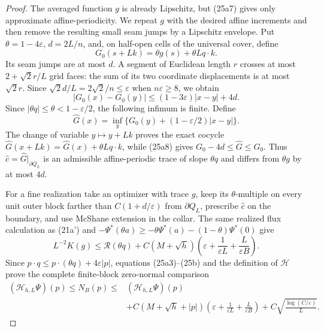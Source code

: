 \documentclass{aomart}
\theoremstyle{definition}
\newcommand{\1}{\mathbf 1}
\begin{document}
\begin{proof}
The averaged function $g$ is already Lipschitz, but (25a7) gives only
approximate affine-periodicity.  We repeat $g$ with the desired affine
increments and then remove the resulting small seam jumps by a Lipschitz
envelope.  Put
$\theta=1-4\varepsilon$, $d=2L/n$, and, on half-open cells of the
universal cover, define
\begin{equation*}
G_ 0(s+Lk)=\theta g(s)+\theta Lq\cdot k.
\end{equation*}
Its seam jumps are at most $d$.  A segment of Euclidean length $r$
crosses at most $2+\sqrt2r/L$ grid faces: the sum of its two coordinate
displacements is at most $\sqrt2r$.  Since
$\sqrt2d/L=2\sqrt2/n\leq\varepsilon$ when $n\varepsilon\geq8$, we obtain
\begin{equation}
|G_ 0(x)-G_ 0(y)|\leq(1-3\varepsilon)|x-y|+4d.
\tag{25a8}
\end{equation}
Since $|\theta q|\leq\theta<1-\varepsilon/2$, the following
infimum is finite.  Define
\begin{equation*}
\widehat G(x)=\inf_ y\{G_ 0(y)+(1-\varepsilon/2)|x-y|\}.
\end{equation*}
The change of variable $y\mapsto y+Lk$ proves the exact cocycle
$\widehat G(x+Lk)=\widehat G(x)+\theta Lq\cdot k$, while (25a8)
gives $G_ 0-4d\leq\widehat G\leq G_ 0$.  Thus
$\widehat c=\widehat G|_ {\partial Q_ L}$ is an admissible
affine-periodic trace of slope $\theta q$ and differs from
$\theta g$ by at most $4d$.

For a fine realization take an optimizer with trace $g$, keep its
$\theta$-multiple on every unit outer block farther than
$C(1+d/\varepsilon)$ from $\partial Q_ L$, prescribe
$\widehat c$ on the boundary, and use McShane extension in the collar.
The same realized flux calculation as (21a') and
$-\Psi^*(\theta a)\geq-\theta\Psi^*(a)
-(1-\theta)\Psi^*(0)$ give
\begin{equation}
L^{-2}K(g)\leq \mathcal R(\theta q)+C(M+\sqrt h)
\left(\varepsilon+\frac1{\varepsilon L}
+\frac L{\varepsilon B}\right).
\tag{25b}
\end{equation}
Since $p\cdot q\leq p\cdot(\theta q)+4\varepsilon|p|$, equations
(25a3)--(25b) and the definition of $\mathcal H$ prove the complete
finite-block zero-normal comparison
\begin{equation}
\boxed{\begin{aligned}
(\mathcal H_ {h,L}\Psi)(p)\leq N_ B(p)
\leq{}&(\mathcal H_ {h,L}\Psi)(p)\\
&+C(M+\sqrt h+|p|)
\left(\varepsilon+\frac1{\varepsilon L}
+\frac L{\varepsilon B}\right)
+C\sqrt{\frac{\log(C/\varepsilon)}L}.
\end{aligned}}
\tag{26}
\end{equation}


\end{proof}
\end{document}
